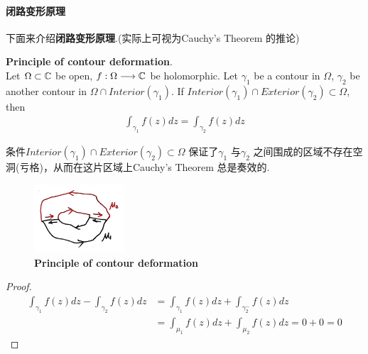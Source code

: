 \paragraph{闭路变形原理}
	下面来介绍\textbf{闭路变形原理}.(实际上可视为Cauchy's Theorem 的推论)
	\begin{thm}\label{thm 5.1.1}
		\textbf{Principle of contour deformation}.\\
		Let $\Omega \subset \mathbb{C}$ be open, $f : \Omega \longrightarrow \mathbb{C}$ be holomorphic. Let $\gamma_1$ be a contour in $\Omega$, $\gamma_2$ be another contour in $\Omega \cap Interior(\gamma_1)$. If $Interior(\gamma_1) \cap Exterior(\gamma_2) \subset \Omega$, then
		\begin{align}
			\int_{\gamma_1}{f(z) dz} = \int_{\gamma_2}{f(z) dz}
		\end{align}
		
		\vspace{1em}
		\begin{rmk}
			条件$Interior(\gamma_1) \cap Exterior(\gamma_2) \subset \Omega$ 保证了$\gamma_1$ 与$\gamma_2$ 之间围成的区域不存在空洞(亏格)，从而在这片区域上Cauchy's Theorem 总是奏效的.
		\end{rmk}
	
		\begin{figure}[htbp]  %
			\centering  %
			\includegraphics[width=0.3\textwidth]{figure/5.1-1} %
			\caption{\textbf{Principle of contour deformation}} %
			\label{pic 5.1-1}
		\end{figure}
	
		\vspace{2em}
		\begin{proof}
			\begin{align}
				\int_{\gamma_1}{f(z) dz} - \int_{\gamma_2}{f(z) dz} 
				&= \int_{\gamma_1}{f(z) dz} + \int_{\gamma_{2}^{-}}{f(z) dz} \\
				&= \int_{\mu_1}{f(z) dz} + \int_{\mu_2}{f(z) dz} = 0 + 0 = 0
			\end{align}
		\end{proof}	
	\end{thm}

